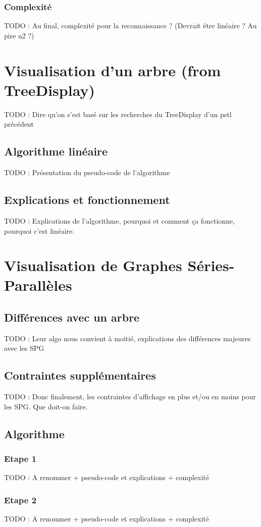 \documentclass[11pt]{report}
\begin{document}
\subsection{Complexité}
TODO : Au final, complexité pour la reconnaissance ? (Devrait être linéaire ? Au pire n2 ?)

\chapter{Visualisation d'un arbre (from TreeDisplay)}
TODO : Dire qu'on s'est basé sur les recherches du TreeDisplay d'un pstl précédent
\section{Algorithme linéaire}
TODO : Présentation du pseudo-code de l'algorithme
\section{Explications et fonctionnement}
TODO : Explications de l'algorithme, pourquoi et comment ça fonctionne, pourquoi c'est linéaire.

\chapter{Visualisation de Graphes Séries-Parallèles}
\section{Différences avec un arbre}
TODO : Leur algo nous convient à moitié, explications des différences majeures avec les SPG
\section{Contraintes supplémentaires}
TODO : Donc finalement, les contraintes d'affichage en plus et/ou en moins pour les SPG. Que doit-on faire.
\section{Algorithme}
\subsection{Etape 1}
TODO : A renommer + pseudo-code et explications + complexité
\subsection{Etape 2}
TODO : A renommer + pseudo-code et explications + complexité
\end{document}

